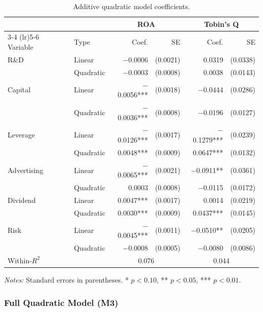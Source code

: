 \documentclass[12pt]{article}
\begin{document}
\begin{table}[htbp]
\centering
\caption{Additive quadratic model coefficients.}
\label{tab:additive}
\begin{tabular}{llrrrr}
\toprule
 & & \multicolumn{2}{c}{ROA} & \multicolumn{2}{c}{Tobin's Q} \\
\cmidrule(lr){3-4} \cmidrule(lr){5-6}
Variable & Type & Coef. & SE & Coef. & SE \\
\midrule
R\&D          & Linear    & $-$0.0006       & (0.0021) &    0.0319       & (0.0338) \\
              & Quadratic & $-$0.0003       & (0.0008) &    0.0038       & (0.0143) \\
Capital       & Linear    & $-$0.0056***    & (0.0018) & $-$0.0444       & (0.0286) \\
              & Quadratic & $-$0.0036***    & (0.0008) & $-$0.0196       & (0.0127) \\
Leverage      & Linear    & $-$0.0126***    & (0.0017) & $-$0.1279***    & (0.0239) \\
              & Quadratic &    0.0048***    & (0.0009) &    0.0647***    & (0.0132) \\
Advertising   & Linear    & $-$0.0065***    & (0.0021) & $-$0.0911**     & (0.0361) \\
              & Quadratic &    0.0003       & (0.0008) & $-$0.0115       & (0.0172) \\
Dividend      & Linear    &    0.0047***    & (0.0017) &    0.0014       & (0.0219) \\
              & Quadratic &    0.0030***    & (0.0009) &    0.0437***    & (0.0145) \\
Risk          & Linear    & $-$0.0045***    & (0.0011) & $-$0.0510**     & (0.0205) \\
              & Quadratic & $-$0.0008       & (0.0005) & $-$0.0080       & (0.0086) \\
\midrule
Within-$R^2$  &           & \multicolumn{2}{c}{0.076} & \multicolumn{2}{c}{0.044} \\
\bottomrule
\end{tabular}

\smallskip
\footnotesize\textit{Notes:} Standard errors in parentheses. * $p < 0.10$, ** $p < 0.05$, *** $p < 0.01$.
\end{table}

\subsubsection{Full Quadratic Model (M3)}
\end{document}

